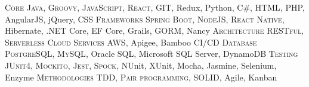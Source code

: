 %
%
%

	\begin{scholarship}
		\scholarshipentry
			{\textsc{Core}}
			{\textsc{Java}, \textsc{Groovy}, \textsc{JavaScript}, \textsc{React}, \textsc{GIT}, Redux, Python, C\#, HTML, PHP, AngularJS, jQuery, CSS}
		\scholarshipentry
			{\textsc{Frameworks}}
			{\textsc{Spring Boot}, \textsc{NodeJS}, \textsc{React Native}, Hibernate, .NET Core, EF Core, Grails, GORM, Nancy}
		\scholarshipentry
			{\textsc{Architecture}}
			{\textsc{RESTful}, \textsc{Serverless}}
		\scholarshipentry
			{\textsc{Cloud Services}}
			{\textsc{AWS}, Apigee, Bamboo CI/CD}
		\scholarshipentry
			{\textsc{Database}}
			{\textsc{PostgreSQL}, \textsc{MySQL}, Oracle SQL, Microsoft SQL Server, DynamoDB}
		\scholarshipentry
			{\textsc{Testing}}
			{\textsc{JUnit4}, \textsc{Mockito}, \textsc{Jest}, \textsc{Spock}, NUnit, XUnit, Mocha, Jasmine, Selenium, Enzyme}
		\scholarshipentry
			{\textsc{Methodologies}}
			{\textsc{TDD}, \textsc{Pair programming}, \textsc{SOLID}, Agile, Kanban}
	\end{scholarship}